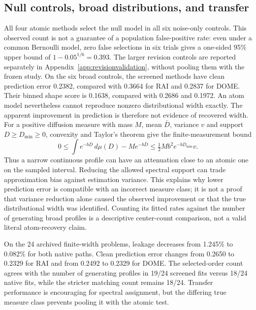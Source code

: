 \subsection{Null controls, broad distributions, and transfer}
All four atomic methods select the null model in all six noise-only controls. This observed count is not a guarantee of a population false-positive rate: even under a common Bernoulli model, zero false selections in six trials gives a one-sided 95\% upper bound of $1-0.05^{1/6}=0.393$. The larger revision controls are reported separately in Appendix~\ref{app:revisionvalidation}, without pooling them with the frozen study. On the six broad controls, the screened methods have clean prediction error 0.2382, compared with 0.3664 for RAI and 0.2837 for DOME. Their binned shape score is 0.1638, compared with 0.2686 and 0.1972. An atom model nevertheless cannot reproduce nonzero distributional width exactly. The apparent improvement in prediction is therefore not evidence of recovered width. For a positive diffusion measure with mass $M$, mean $\bar D$, variance $v$ and support $D\geq D_{\min}\geq0$, convexity and Taylor's theorem give the finite-measurement bound
\[
0\leq\int e^{-bD}\,d\mu(D)-M e^{-b\bar D}\leq \tfrac12 M b^2 e^{-bD_{\min}}v.
\]
Thus a narrow continuous profile can have an attenuation close to an atomic one on the sampled interval. Reducing the allowed spectral support can trade approximation bias against estimation variance. This explains why lower prediction error is compatible with an incorrect measure class; it is not a proof that variance reduction alone caused the observed improvement or that the true distributional width was identified. Counting its fitted rates against the number of generating broad profiles is a descriptive center-count comparison, not a valid literal atom-recovery claim.

On the 24 archived finite-width problems, leakage decreases from 1.245\% to 0.082\% for both native paths. Clean prediction error changes from 0.2650 to 0.2329 for RAI and from 0.2492 to 0.2329 for DOME. The selected-order count agrees with the number of generating profiles in 19/24 screened fits versus 18/24 native fits, while the stricter matching count remains 18/24. Transfer performance is encouraging for spectral assignment, but the differing true measure class prevents pooling it with the atomic test.

